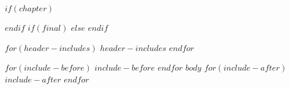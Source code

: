 $if(chapter)$
\setcounter{chapter}{$chapter$}
\addtocounter{chapter}{-1}
$endif$
$if(final)$
\DraftOff
$else$
\DraftOn
$endif$

$for(header-includes)$
$header-includes$
$endfor$

$for(include-before)$
$include-before$
$endfor$
$body$
$for(include-after)$
$include-after$
$endfor$
